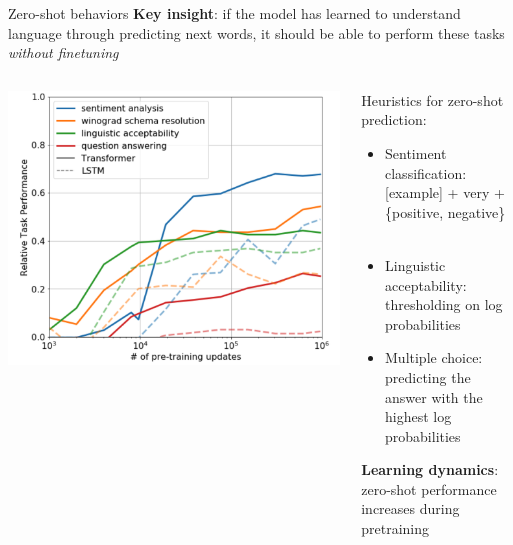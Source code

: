 \documentclass[usenames,dvipsnames,notes,11pt,aspectratio=169,hyperref={colorlinks=true, linkcolor=blue}]{beamer}
\begin{document}
\begin{frame}
    {Zero-shot behaviors}
    \textbf{Key insight}: if the model has learned to understand language through predicting next words, it should be able to perform these tasks {\em without finetuning}

    \vspace{1em}
    \pause
    \begin{columns}
        \begin{column}{0.4\textwidth}
        \includegraphics[width=\textwidth]{figures/gpt1-zs}
        \end{column}
        \begin{column}{0.6\textwidth}
            Heuristics for zero-shot prediction:
            \begin{itemize}
                \item Sentiment classification: [example] + very + \{positive, negative\} $\quad$ 
                \item Linguistic acceptability: thresholding on log probabilities
                \item Multiple choice: predicting the answer with the highest log probabilities
            \end{itemize}
            \textbf{Learning dynamics}: zero-shot performance increases during pretraining
        \end{column}
    \end{columns}
\end{frame}
\end{document}
